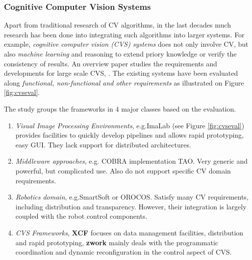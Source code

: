 \subsubsection{Cognitive Computer Vision Systems}
Apart from traditional research of CV algorithms, in the last decades much research has been done into integrating such algorithms into larger systems. For example, {\em cognitive computer vision (CVS) systems} does not only involve CV, but also {\em machine learning} and reasoning to extend priory knowledge or verify the consistency of results. An overview paper studies the requirements and developments for large scale CVS, \cite{WredeBSPV04}. The existing systems have been evaluated along {\em functional, non-functional and other requirements} as illustrated on Figure \ref{fig:cvseval}.

The study groups the frameworks in $4$ major classes based on the evaluation.  

\begin{enumerate}
\item{{\em Visual Image Processing Environments}, e.g.ImaLab (see Figure \ref{fig:cvseval}) provides facilities to quickly develop pipelines and allows rapid prototyping, easy GUI. They lack support for distributed architectures.}
\item{{\em Middleware approaches}, e.g. COBRA implementation TAO. Very generic and powerful, but complicated use. Also do not support specific CV domain requirements.}
\item{{\em Robotics domain}, e.g.SmartSoft or OROCOS. Satisfy many CV requirements, including distribution and transparency. However, their integration is largely coupled with the robot control components.}
\item{{\em CVS Frameworks}, {\bf XCF} \cite{Wrede2004-AXB} focuses on data management
facilities, distribution and rapid prototyping, {\bf zwork} \cite{ponweiser2003reusable} mainly deals with the programmatic coordination and
dynamic reconfiguration in the control aspect of CVS.}
\end{enumerate}

